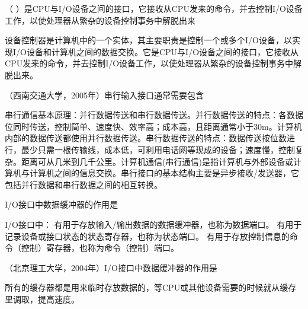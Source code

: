 \question （
）是CPU与I/O设备之间的接口，它接收从CPU发来的命令，并去控制I/O设备工作，以使处理器从繁杂的设备控制事务中解脱出来
\par{}
\begin{solution}设备控制器是计算机中的一个实体，其主要职责是控制一个或多个I/O设备，以实现I/O设备和计算机之间的数据交换。它是CPU与I/O设备之间的接口，它接收从CPU发来的命令，并去控制I/O设备工作，以使处理器从繁杂的设备控制事务中解脱出来。
\end{solution}
\question （西南交通大学，2005年）串行输入接口通常需要包含
\par{}
\begin{solution}串行通信基本原理：并行数据传送和串行数据传送。并行数据传送的特点：各数据位同时传送，控制简单、速度快、效率高；成本高，且距离通常小于30m。计算机内部的数据传送都使用并行数据传送。串行数据传送的特点：数据传送按位数进行，最少只需一根传输线，成本低，可利用电话网等现成的设备；速度慢，控制复杂。距离可从几米到几千公里。计算机通信(串行通信)是指计算机与外部设备或计算机与计算机之间的信息交换。串行接口的基本结构主要是异步接收/发送器，它包括并行数据和串行数据之间的相互转换。
\end{solution}
\question I/O接口中数据缓冲器的作用是
\par{}
\begin{solution}I/O接口中： 有用于存放输入/输出数据的数据缓冲器，也称为数据端口。
有用于记录设备或接口状态的状态寄存器，也称为状态端口。
有用于存放控制信息的命令（控制）寄存器，也称为命令（控制）端口。
\end{solution}
\question （北京理工大学，2004年）I/O接口中数据缓冲器的作用是
\par{}
\begin{solution}所有的缓存器都是用来临时存放数据的，等CPU或其他设备需要的时候就从缓存里调取，提高速度。
\end{solution}
